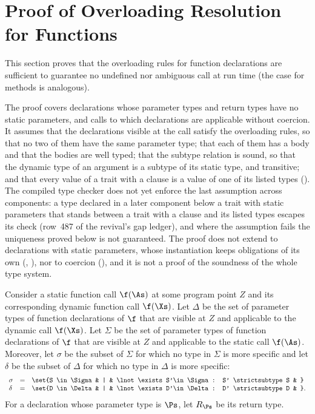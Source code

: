 %
%
%
%

\section{Proof of Overloading Resolution for Functions}

This section proves that the overloading rules for
function declarations are sufficient to guarantee no undefined nor
ambiguous call at run time (the case for methods is analogous).

The proof covers declarations whose parameter types and return types have no
static parameters, and calls to which declarations are applicable without
coercion.
It assumes that the declarations visible at the call satisfy the overloading
rules, so that no two of them have the same parameter type; that each of them has
a body and that the bodies are well typed; that the subtype relation is sound,
so that the dynamic type of an argument is a subtype of its static type, and
transitive; and that every value of a trait with a  clause is a
value of one of its listed types ().
The compiled type checker does not yet enforce the last assumption across
components: a type declared in a later component below a trait with static
parameters that stands between a trait with a  clause and its
listed types escapes its check (row~487 of the revival's gap ledger), and where
the assumption fails the uniqueness proved below is not guaranteed.
The proof does not extend to declarations with static parameters, whose
instantiation keeps obligations of its own (,
), nor to coercion (),
and it is not a proof of the soundness of the whole type system.

Consider a static function call $\f(\As)$ at some program point $Z$
and its corresponding dynamic function call $\f(\Xs)$.  Let $\Delta$
be the set of parameter types of function declarations of $\f$ that
are visible at $Z$ and applicable to the dynamic call $\f(\Xs)$.  Let
$\Sigma$ be the set of parameter types of function declarations of
$\f$ that are visible at $Z$ and applicable to the static call
$\f(\As)$.  Moreover, let $\sigma$ be the subset of $\Sigma$ for which
no type in $\Sigma$ is more specific and let $\delta$ be the
subset of $\Delta$ for which no type in $\Delta$ is more
specific:
\[
\begin{array}{lclcll}
\sigma & = & \set{S \in \Sigma & | & \lnot \exists S'\in\Sigma: S' \strictsubtype S & }
\\
\delta & = & \set{D \in \Delta & | & \lnot \exists D'\in\Delta: D' \strictsubtype D & }.
\end{array}
\]
For a declaration whose parameter type is $\Ps$, let $R_{\Ps}$ be its return
type.

